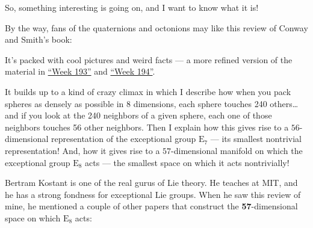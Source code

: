 \documentclass{article}
\def\tightlist{}
\renewcommand{\texttt}[1]{%
  \begingroup
  \ttfamily
  \begingroup\lccode`~=`/\lowercase{\endgroup\def~}{/\discretionary{}{}{}}%
  \begingroup\lccode`~=`[\lowercase{\endgroup\def~}{[\discretionary{}{}{}}%
  \begingroup\lccode`~=`.\lowercase{\endgroup\def~}{.\discretionary{}{}{}}%
  \catcode`/=\active\catcode`[=\active\catcode`.=\active
  \scantokens{#1\noexpand}%
  \endgroup
}
\begin{document}
So, something interesting is going on, and I want to know what it is!

By the way, fans of the quaternions and octonions may like this review
of Conway and Smith's book:


It's packed with cool pictures and weird facts --- a more refined
version of the material in \protect\hyperlink{week193}{``Week 193''} and
\protect\hyperlink{week194}{``Week 194''}.

It builds up to a kind of crazy climax in which I describe how when you
pack spheres as densely as possible in 8 dimensions, each sphere touches
240 others\ldots{} and if you look at the 240 neighbors of a given
sphere, each one of those neighbors touches 56 other neighbors. Then I
explain how this gives rise to a \(56\)-dimensional representation of
the exceptional group \(\mathrm{E}_7\) --- its smallest nontrivial
representation! And, how it gives rise to a \(57\)-dimensional manifold
on which the exceptional group \(\mathrm{E}_8\) acts --- the smallest
space on which it acts nontrivially!

Bertram Kostant is one of the real gurus of Lie theory. He teaches at
MIT, and he has a strong fondness for exceptional Lie groups. When he
saw this review of mine, he mentioned a couple of other papers that
construct the \textbf{57}-dimensional space on which \(\mathrm{E}_8\)
acts:

\end{document}
